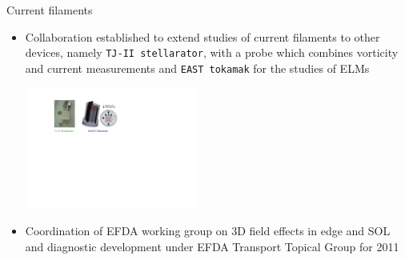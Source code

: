 \documentclass[t,10pt]{beamer}
\begin{document}
\begin{frame}{Current filaments}
\begin{itemize}
\item Collaboration established to extend studies of current filaments
  to other devices, namely \textcolor{ta3chameleon}{\texttt{TJ-II
      stellarator}}, with a probe which combines vorticity and current
  measurements and \textcolor{ta3skyblue}{\texttt{EAST tokamak}} for
  the studies of ELMs
\begin{center}
\includegraphics[height=4cm]{collaboration}
\end{center}
\item Coordination of EFDA working group on 3D field effects in edge
  and SOL and diagnostic development under EFDA Transport Topical
  Group for 2011
\end{itemize}
\end{frame}
\end{document}
